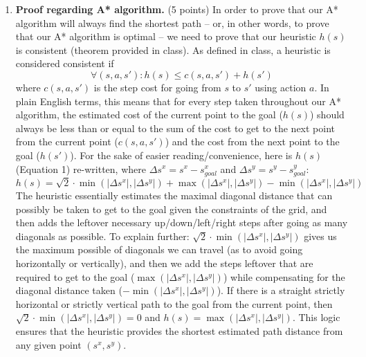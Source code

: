 \documentclass[12pt]{article}
\begin{document}
\begin{enumerate}[label=(\alph*)]
  \item \textbf{Proof regarding A* algorithm.} (5 points) In order to prove that our A* algorithm will always find the shortest path -- or, in other words, to prove that our A* algorithm is optimal -- we need to prove that our heuristic $h(s)$ is consistent (theorem provided in class). As defined in class, a heuristic is considered consistent if 
  \begin{equation}
      \forall(s, a, s'): h(s) \leq c(s, a, s') + h(s')
  \end{equation}
  where $c(s, a, s')$ is the step cost for going from $s$ to $s'$ using action $a$. In plain English terms, this means that for every step taken throughout our A* algorithm, the estimated cost of the current point to the goal ($h(s)$) should always be less than or equal to the sum of the cost to get to the next point from the current point ($c(s, a, s')$) and the cost from the next point to the goal ($h(s')$). For the sake of easier reading/convenience, here is $h(s)$ (Equation 1) re-written, where $\Delta s^x = s^x - s_{goal}^x$ and $\Delta s^y = s^y - s_{goal}^y$:
  \begin{equation}
      h(s) = \sqrt{2}\cdot\min(|\Delta s^x|, |\Delta s^y|) + \max(|\Delta s^x|, |\Delta s^y|) - \min(|\Delta s^x|, |\Delta s^y|)
  \end{equation}
  The heuristic essentially estimates the maximal diagonal distance that can possibly be taken to get to the goal given the constraints of the grid, and then adds the leftover necessary up/down/left/right steps after going as many diagonals as possible. To explain further: $\sqrt{2}\cdot\min(|\Delta s^x|, |\Delta s^y|)$ gives us the maximum possible of diagonals we can travel (as to avoid going horizontally or vertically), and then we add the steps leftover that are required to get to the goal ($\max(|\Delta s^x|, |\Delta s^y|)$) while compensating for the diagonal distance taken ($- \min(|\Delta s^x|, |\Delta s^y|)$). If there is a straight strictly horizontal or strictly vertical path to the goal from the current point, then $\sqrt{2}\cdot\min(|\Delta s^x|, |\Delta s^y|) = 0$ and $h(s) = \max(|\Delta s^x|, |\Delta s^y|)$.  This logic ensures that the heuristic provides the shortest estimated path distance from any given point $(s^x, s^y)$. 
  

\end{enumerate}
\end{document}
